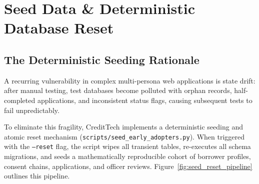 \chapter{Seed Data \& Deterministic Database Reset}
\label{chap:seed_data}

\section{The Deterministic Seeding Rationale}
A recurring vulnerability in complex multi-persona web applications is state drift: after manual testing, test databases become polluted with orphan records, half-completed applications, and inconsistent status flags, causing subsequent tests to fail unpredictably. 

To eliminate this fragility, CreditTech implements a deterministic seeding and atomic reset mechanism (\texttt{scripts/seed\_early\_adopters.py}). When triggered with the \texttt{--reset} flag, the script wipes all transient tables, re-executes all schema migrations, and seeds a mathematically reproducible cohort of borrower profiles, consent chains, applications, and officer reviews. Figure~\ref{fig:seed_reset_pipeline} outlines this pipeline.

